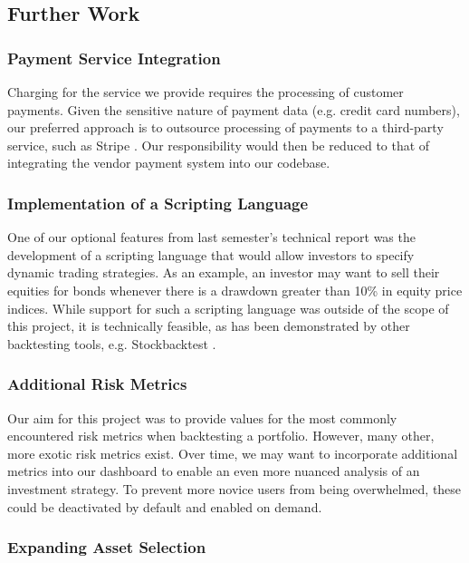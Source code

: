 \documentclass[main.tex]{subfiles}
\begin{document}
\subsection{Further Work}

\subsubsection{Payment Service Integration}

Charging for the service we provide requires the processing of customer payments. Given the sensitive nature of payment data (e.g. credit card numbers), our preferred approach is to outsource processing of payments to a third-party service, such as Stripe \cite{stripe}. Our responsibility would then be reduced to that of integrating the vendor payment system into our codebase.

\subsubsection{Implementation of a Scripting Language}

One of our optional features from last semester's technical report was the development of a scripting language that would allow investors to specify dynamic trading strategies. As an example, an investor may want to sell their equities for bonds whenever there is a drawdown greater than 10\% in equity price indices. While support for such a scripting language was outside of the scope of this project, it is technically feasible, as has been demonstrated by other backtesting tools, e.g. Stockbacktest \cite{stockbacktest}.

\subsubsection{Additional Risk Metrics}

Our aim for this project was to provide values for the most commonly encountered risk metrics when backtesting a portfolio. However, many other, more exotic risk metrics exist. Over time, we may want to incorporate additional metrics into our dashboard to enable an even more nuanced analysis of an investment strategy. To prevent more novice users from being overwhelmed, these could be deactivated by default and enabled on demand.

\subsubsection{Expanding Asset Selection}
\end{document}

